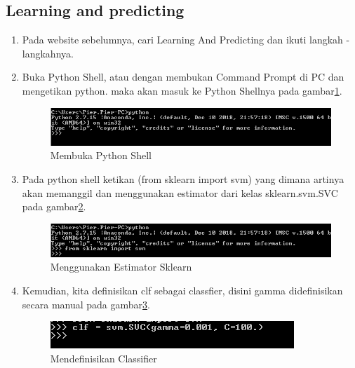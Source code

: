 \subsection{Learning and predicting}
\begin{enumerate}
\item Pada website sebelumnya, cari Learning And Predicting dan ikuti langkah -langkahnya.
\item Buka Python Shell, atau dengan membukan Command Prompt di PC dan mengetikan python. maka akan masuk ke Python Shellnya pada gambar\ref{gambar1}.
\begin{figure}
	\begin{center}
   	 \includegraphics[scale=0.5]{figures/tasya1.png}
   	 \caption{Membuka Python Shell}
   	 \label{gambar1}
	\end{center}
\end{figure}

\item Pada python shell ketikan (from sklearn import svm) yang dimana artinya akan memanggil dan menggunakan estimator dari kelas sklearn.svm.SVC pada gambar\ref{gambar2}.
\begin{figure}
	\begin{center}
   	 \includegraphics[scale=0.5]{figures/tasya2.png}
   	 \caption{Menggunakan Estimator Sklearn}
     \label{gambar2}	
	\end{center}
\end{figure}

\item Kemudian, kita definisikan clf sebagai classfier, disini gamma didefinisikan secara manual pada gambar\ref{gambar3}.
\begin{figure}
	\begin{center}
   	 \includegraphics[scale=1]{figures/tasya3.png}
   	 \caption{Mendefinisikan Classifier}
     \label{gambar3}	
	\end{center}
\end{figure}


\end{enumerate}
